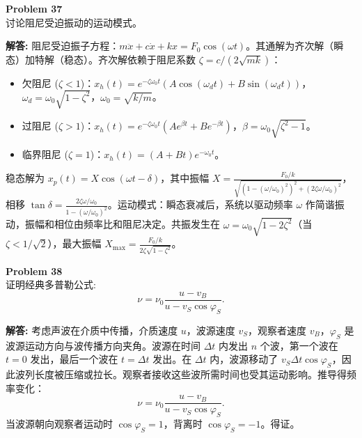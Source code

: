 \documentclass[12pt, a4paper, oneside]{ctexart}
\newenvironment{solution}{\par\noindent\textbf{解答:}\quad}{\par}
\begin{document}
\begin{mdframed}[backgroundcolor=gray!10, linewidth=0pt]
    \textbf{Problem 37} \\
    讨论阻尼受迫振动的运动模式。
\end{mdframed}
\begin{solution}
    阻尼受迫振子方程：\(m \ddot{x} + c \dot{x} + k x = F_0 \cos(\omega t)\)。其通解为齐次解（瞬态）加特解（稳态）。齐次解依赖于阻尼系数 \(\zeta = c/(2\sqrt{mk})\)：
    \begin{itemize}
        \item 欠阻尼 (\(\zeta<1\))：\(x_h(t) = e^{-\zeta \omega_0 t} (A \cos(\omega_d t) + B \sin(\omega_d t))\)，\(\omega_d = \omega_0 \sqrt{1-\zeta^2}\)，\(\omega_0=\sqrt{k/m}\)。
        \item 过阻尼 (\(\zeta>1\))：\(x_h(t) = e^{-\zeta \omega_0 t} (A e^{\beta t} + B e^{-\beta t})\)，\(\beta = \omega_0 \sqrt{\zeta^2-1}\)。
        \item 临界阻尼 (\(\zeta=1\))：\(x_h(t) = (A+Bt) e^{-\omega_0 t}\)。
    \end{itemize}
    
    稳态解为 \(x_p(t) = X \cos(\omega t - \delta)\)，其中振幅 \(X = \frac{F_0/k}{\sqrt{(1-(\omega/\omega_0)^2)^2 + (2\zeta \omega/\omega_0)^2}}\)，相移 \(\tan \delta = \frac{2\zeta \omega/\omega_0}{1-(\omega/\omega_0)^2}\)。运动模式：瞬态衰减后，系统以驱动频率 \(\omega\) 作简谐振动，振幅和相位由频率比和阻尼决定。共振发生在 \(\omega = \omega_0 \sqrt{1-2\zeta^2}\)（当 \(\zeta<1/\sqrt{2}\)），最大振幅 \(X_{\text{max}} = \frac{F_0/k}{2\zeta\sqrt{1-\zeta^2}}\)。
\end{solution}

\begin{mdframed}[backgroundcolor=gray!10, linewidth=0pt]
    \textbf{Problem 38} \\
    证明经典多普勒公式:
    \[
    \nu = \nu_0 \frac{u - v_B}{u - v_S \cos\varphi_S}.
    \]
\end{mdframed}
\begin{solution}
    考虑声波在介质中传播，介质速度 \(u\)，波源速度 \(v_S\)，观察者速度 \(v_B\)，\(\varphi_S\) 是波源运动方向与波传播方向夹角。波源在时间 \(\Delta t\) 内发出 \(n\) 个波，第一个波在 \(t=0\) 发出，最后一个波在 \(t=\Delta t\) 发出。在 \(\Delta t\) 内，波源移动了 \(v_S \Delta t \cos\varphi_S\)，因此波列长度被压缩或拉长。观察者接收这些波所需时间也受其运动影响。推导得频率变化：
    \[
    \nu = \nu_0 \frac{u - v_B}{u - v_S \cos\varphi_S}.
    \]
    当波源朝向观察者运动时 \(\cos\varphi_S = 1\)，背离时 \(\cos\varphi_S = -1\)。得证。
\end{solution}
\end{document}
